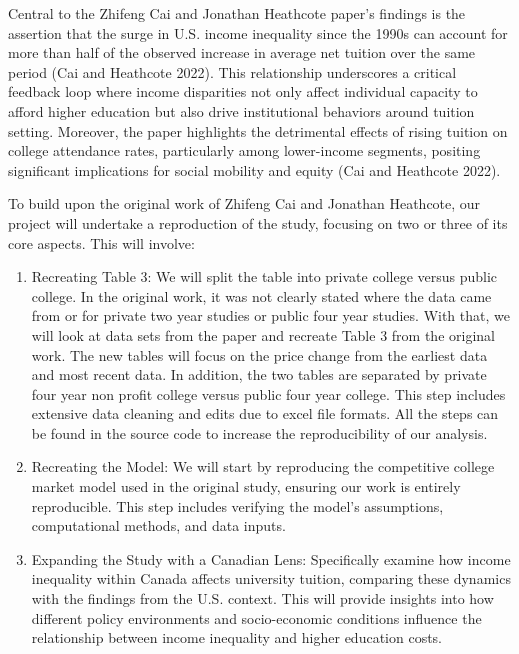 \documentclass[
  letterpaper,
  DIV=11,
  numbers=noendperiod]{scrartcl}
\begin{document}
Central to the Zhifeng Cai and Jonathan Heathcote paper's findings is
the assertion that the surge in U.S. income inequality since the 1990s
can account for more than half of the observed increase in average net
tuition over the same period (Cai and Heathcote 2022). This relationship
underscores a critical feedback loop where income disparities not only
affect individual capacity to afford higher education but also drive
institutional behaviors around tuition setting. Moreover, the paper
highlights the detrimental effects of rising tuition on college
attendance rates, particularly among lower-income segments, positing
significant implications for social mobility and equity (Cai and
Heathcote 2022).

To build upon the original work of Zhifeng Cai and Jonathan Heathcote,
our project will undertake a reproduction of the study, focusing on two
or three of its core aspects. This will involve:

\begin{enumerate}
\def\labelenumi{\arabic{enumi}.}
\item
  Recreating Table 3: We will split the table into private college
  versus public college. In the original work, it was not clearly stated
  where the data came from or for private two year studies or public
  four year studies. With that, we will look at data sets from the paper
  and recreate Table 3 from the original work. The new tables will focus
  on the price change from the earliest data and most recent data. In
  addition, the two tables are separated by private four year non profit
  college versus public four year college. This step includes extensive
  data cleaning and edits due to excel file formats. All the steps can
  be found in the source code to increase the reproducibility of our
  analysis.
\item
  Recreating the Model: We will start by reproducing the competitive
  college market model used in the original study, ensuring our work is
  entirely reproducible. This step includes verifying the model's
  assumptions, computational methods, and data inputs.
\item
  Expanding the Study with a Canadian Lens: Specifically examine how
  income inequality within Canada affects university tuition, comparing
  these dynamics with the findings from the U.S. context. This will
  provide insights into how different policy environments and
  socio-economic conditions influence the relationship between income
  inequality and higher education costs.
\end{enumerate}
\end{document}
